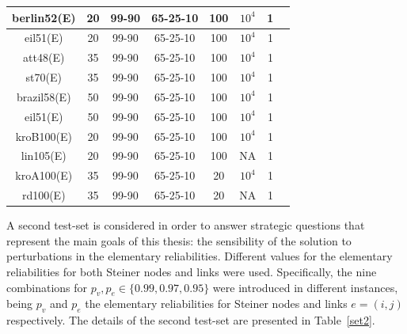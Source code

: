 \begin{table}[H]
\begin{tabular}{|c|c|c|c|c|c|c|c|}
\hline	berlin52(E)	&	20	&	99-90	&	65-25-10	&	100	&	$10^4$	&	1	\\
\hline	eil51(E)	&	20	&	99-90	&	65-25-10	&	100	&	$10^4$	&	1	\\
\hline	att48(E)	&	35	&	99-90	&	65-25-10	&	100	&	$10^4$	&	1	\\
\hline	st70(E)	&	35	&	99-90	&	65-25-10	&	100	&	$10^4$	&	1	\\
\hline	brazil58(E)	&	50	&	99-90	&	65-25-10	&	100	&	$10^4$	&	1	\\
\hline	eil51(E)	&	50	&	99-90	&	65-25-10	&	100	&	$10^4$	&	1	\\
\hline	kroB100(E)	&	20	&	99-90	&	65-25-10	&	100	&	$10^4$	&	1	\\
\hline	lin105(E)	&	20	&	99-90	&	65-25-10	&	100	&	NA	&	1	\\
\hline	kroA100(E)	&	35	&	99-90	&	65-25-10	&	20	&	$10^4$	&	1	\\
\hline	rd100(E)	&	35	&	99-90	&	65-25-10	&	20	&	NA	&	1	\\
\hline
\end{tabular}
\label{set} %
\end{table}

A second test-set is considered in order to answer strategic questions that represent the main 
goals of this thesis: the sensibility of the solution to perturbations in the elementary reliabilities. 
Different values for the elementary reliabilities for both Steiner nodes and links were used. 
Specifically, the nine combinations for $p_{v},p_{e} \in \{0.99, 0.97,0.95\}$ were introduced in 
different instances, being $p_v$ and $p_e$ the elementary reliabilities for Steiner nodes and 
links $e=(i,j)$ respectively. The details of the second test-set are presented in Table~\ref{set2}.  

